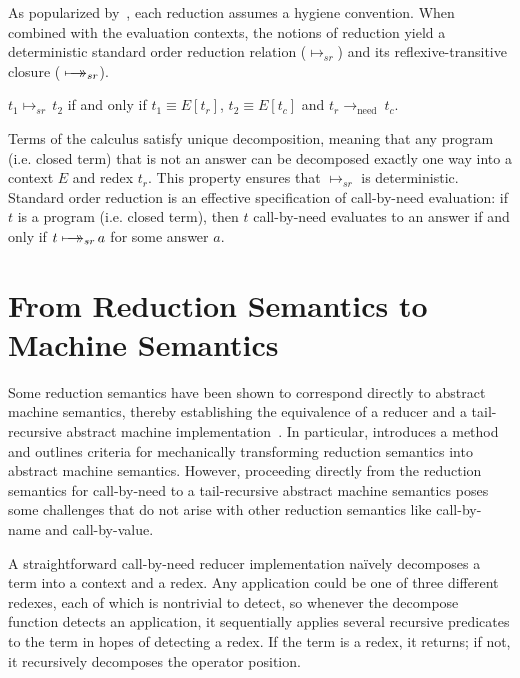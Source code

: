 \documentclass{LMCS}
\theoremstyle{plain}
\theoremstyle{remark}
\newcommand{\mapsTo}[0]{\mbox{\ensuremath{\makebox[0pt][l]{\hspace{7pt}$\rightarrow$}\longmapsto}}}
\newcommand{\sr}[0]{\ensuremath{\longmapsto_{sr}}}
\newcommand{\Sr}[0]{\ensuremath{\mapsTo_{sr}}}
\newcommand{\notion}[0]{\ensuremath{\rightarrow_{\mathrm{need}}}}
\newcommand{\topic}[1]{}
\begin{document}
As popularized by~\citet{barendregt}, each reduction assumes a hygiene
convention.  When combined with the evaluation contexts, the notions of
reduction yield a deterministic standard order reduction relation ($\sr$) and
its reflexive-transitive closure ($\Sr$).
\begin{defi}
  \label{def:sr}
  $t_1 \sr\, t_2$ if and only if $t_1 \equiv E[t_r]$, $t_2 \equiv E[t_c]$ 
  and $t_r \notion\ t_c$.
\end{defi}
Terms of the calculus satisfy unique decomposition, meaning that any
program (i.e. closed term) that is not an answer can be decomposed exactly one
way into a context $E$ and redex $t_r$. This property ensures that
$\sr$ is deterministic.
Standard order reduction is an effective specification of call-by-need
evaluation: if $t$ is a program (i.e. closed term), then $t$ call-by-need
evaluates to an answer if and only if $t \Sr \,a$ for some answer $a$.



\section{From Reduction Semantics to Machine Semantics}
\label{sec:reduction}

\topic{The point: Reduction Semantics don't immediately point to a
  tail-recursive implementation}

Some reduction semantics have been shown to correspond directly to abstract
machine semantics, thereby establishing the equivalence of a reducer and a
tail-recursive abstract machine
implementation~\cite{felleisen86secd,findler09redex}.  In particular,
\citet{danvyTRrefocusing} introduces a method and outlines criteria for
mechanically transforming reduction semantics into abstract machine semantics.
However, proceeding directly from the reduction semantics for call-by-need to a
tail-recursive abstract machine semantics poses some challenges that do not
arise with other reduction semantics like call-by-name and call-by-value.

A straightforward call-by-need reducer implementation na\"ively decomposes a
term into a context and a redex.  Any application could be one of three
different redexes, each of which is nontrivial to detect, so whenever the
decompose function detects an application, it sequentially applies several
recursive predicates to the term in hopes of detecting a redex.  If the term is
a redex, it returns; if not, it recursively decomposes the operator position.
\end{document}
